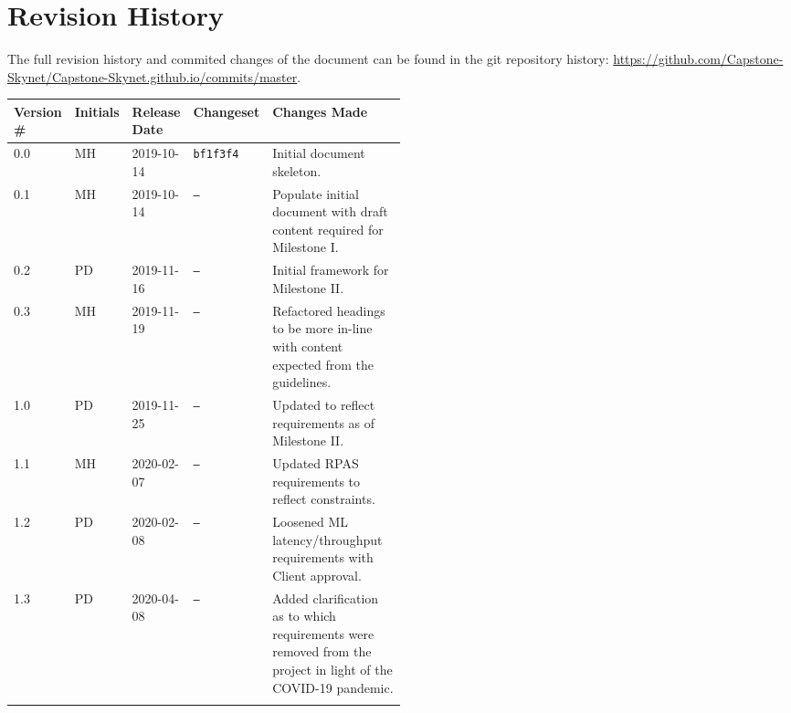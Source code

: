\section*{Revision History}
The full revision history and commited changes of the document can be found in the git repository history: \href{https://github.com/Capstone-Skynet/Capstone-Skynet.github.io}{https://github.com/Capstone-Skynet/Capstone-Skynet.github.io/commits/master}.

\begin{table}[H]
\begin{tabular}{*{4}{l}p{0.5\linewidth}}
\hline
Version \# & Initials & Release Date & Changeset & Changes Made \\ \hline

0.0 & MH & 2019-10-14 & \texttt{bf1f3f4} & Initial document skeleton.\\
0.1 & MH & 2019-10-14 & \texttt{--} & Populate initial document with draft content required for Milestone I.\\
0.2 & PD & 2019-11-16 & \texttt{--} & Initial framework for Milestone II.\\
0.3 & MH & 2019-11-19 & \texttt{--} & Refactored headings to be more in-line with content expected from the guidelines.\\
1.0 & PD & 2019-11-25 & \texttt{--} & Updated to reflect requirements as of Milestone II.\\
1.1 & MH & 2020-02-07 & \texttt{--} & Updated RPAS requirements to reflect constraints.\\
1.2 & PD & 2020-02-08 & \texttt{--} & Loosened ML latency/throughput requirements with Client approval.\\
1.3 & PD & 2020-04-08 & \texttt{--} & Added clarification as to which requirements were removed from the project in light of the COVID-19 pandemic.\\

 & & & \\ \hline
\end{tabular}
\end{table}